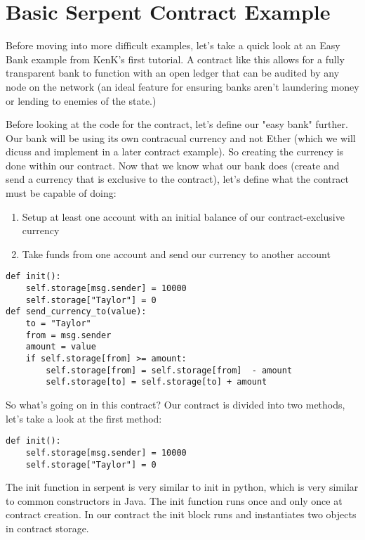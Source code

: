 \documentclass[12pt]{article}
\begin{document}
\section{Basic Serpent Contract Example}
Before moving into more difficult examples, let's take a quick look at an Easy Bank example from KenK's first tutorial. A contract like this allows for a fully transparent bank to function with an open ledger that can be audited by any node on the network (an ideal feature for ensuring banks aren't laundering money or lending to enemies of the state.)

Before looking at the code for the contract, let's define our "easy bank" further. Our bank will be using its own contracual currency and not Ether (which we will dicuss and implement in a later contract example). So creating the currency is done within our contract. Now that we know what our bank does (create and send a currency that is exclusive to the contract), let's define what the contract must be capable of doing:
\begin{enumerate}
\item Setup at least one account with an initial balance of our contract-exclusive currency
\item Take funds from one account and send our currency to another account
\end{enumerate}


\begin{lstlisting}[frame=single]
def init():
	self.storage[msg.sender] = 10000
	self.storage["Taylor"] = 0
def send_currency_to(value):
	to = "Taylor"
	from = msg.sender
	amount = value
	if self.storage[from] >= amount:
		self.storage[from] = self.storage[from]  - amount
		self.storage[to] = self.storage[to] + amount
\end{lstlisting}
		
		
So what's going on in this contract?
Our contract is divided into two methods, let's take a look at the first method:

\begin{lstlisting}
def init():
	self.storage[msg.sender] = 10000
	self.storage["Taylor"] = 0
\end{lstlisting}
	
The init function in serpent is very similar to init in python, which is very similar to common constructors in Java. The init function runs once and only once at contract creation. In our contract the init block runs and instantiates two objects in contract storage.
 
\end{document}
